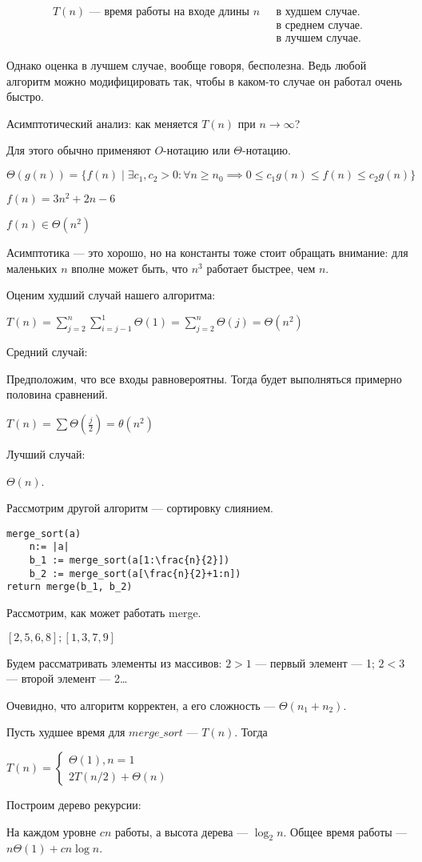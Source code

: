\documentclass[11pt,a4paper]{article}
\begin{document}
\begin{align}
    \text{$T(n)$ --- время работы на входе длины $n$ }&\text{в худшем случае.}\\
    &\text{в среднем случае.} \\
    &\text{в лучшем случае.}
\end{align}

Однако оценка в лучшем случае, вообще говоря, бесполезна. Ведь любой алгоритм можно модифицировать так, чтобы в каком-то случае он
работал очень быстро.

Асимптотический анализ: как меняется $T(n)$ при $n\to \infty$?

Для этого обычно применяют $O$-нотацию или $\Theta$-нотацию.

$\Theta(g(n)) = \{f(n)\mid\exists c_1, c_2 > 0: \forall n\geqslant n_0 \implies 0 \leqslant c_1g(n) \leqslant f(n) \leqslant c_2g(n)\}$

$f(n) = 3n^2+2n-6$

$f(n) \in \Theta(n^2)$

Асимптотика --- это хорошо, но на константы тоже стоит обращать внимание: для маленьких $n$ вполне может быть, что $n^3$ работает
быстрее, чем $n$.

Оценим худший случай нашего алгоритма:

$T(n) = \sum\limits_{j=2}^n\sum\limits_{i=j-1}^1\Theta(1) = \sum\limits_{j=2}^n\Theta(j) = \Theta(n^2)$

Средний случай:

Предположим, что все входы равновероятны. Тогда будет выполняться примерно половина сравнений.

$T(n) = \sum\limits\Theta(\frac{j}{2}) = \theta(n^2)$

Лучший случай:

$\Theta(n)$.

Рассмотрим другой алгоритм --- сортировку слиянием.

\begin{lstlisting}
merge_sort(a)
    n:= |a|
    b_1 := merge_sort(a[1:\frac{n}{2}])
    b_2 := merge_sort(a[\frac{n}{2}+1:n])
return merge(b_1, b_2)
\end{lstlisting}

Рассмотрим, как может работать merge.

$[2,5,6,8];[1,3,7,9]$

Будем рассматривать элементы из массивов: $2>1$ --- первый элемент --- 1; $2<3$ --- второй элемент --- 2\dots

Очевидно, что алгоритм корректен, а его сложность --- $\Theta(n_1 + n_2)$.

Пусть худшее время для $merge\_sort$ --- $T(n)$. Тогда

$T(n) = \begin{cases}
    \Theta(1), n=1\\
    2T(n/2)+\Theta(n)
\end{cases}$

Построим дерево рекурсии:


На каждом уровне $cn$ работы, а высота дерева --- $\log_2n$. Общее время работы --- $n\Theta(1)+cn\log n$.
\end{document}
